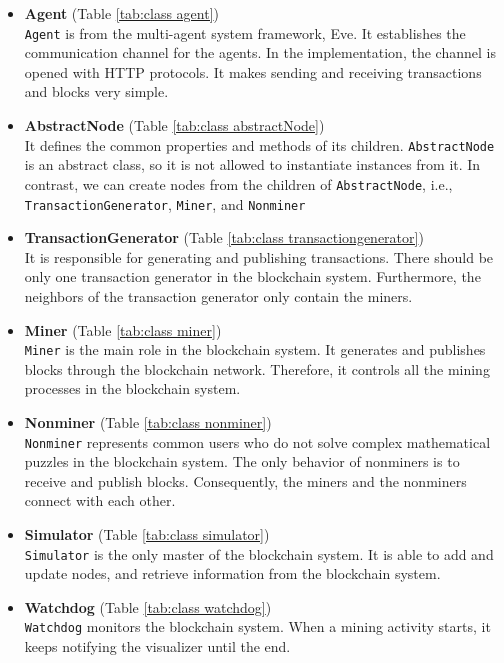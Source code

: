\begin{itemize}
    \item \textbf{Agent} (Table \ref{tab:class agent}) \\
        \texttt{Agent} is from the multi-agent system framework, Eve. It establishes the communication channel for the agents. In the implementation, the channel is opened with HTTP protocols. It makes sending and receiving transactions and blocks very simple. 
    \item \textbf{AbstractNode} (Table \ref{tab:class abstractNode}) \\
        It defines the common properties and methods of its children. \texttt{AbstractNode} is an abstract class, so it is not allowed to instantiate instances from it. In contrast, we can create nodes from the children of \texttt{AbstractNode}, i.e., \texttt{TransactionGenerator}, \texttt{Miner}, and \texttt{Nonminer}
    \item \textbf{TransactionGenerator} (Table \ref{tab:class transactiongenerator}) \\
        It is responsible for generating and publishing transactions. There should be only one transaction generator in the blockchain system. Furthermore, the neighbors of the transaction generator only contain the miners.
    \item \textbf{Miner} (Table \ref{tab:class miner}) \\
        \texttt{Miner} is the main role in the blockchain system. It generates and publishes blocks through the blockchain network. Therefore, it controls all the mining processes in the blockchain system.
    \item \textbf{Nonminer} (Table \ref{tab:class nonminer}) \\
        \texttt{Nonminer} represents common users who do not solve complex mathematical puzzles in the blockchain system. The only behavior of nonminers is to receive and publish blocks. Consequently, the miners and the nonminers connect with each other. 
    \item \textbf{Simulator} (Table \ref{tab:class simulator}) \\
        \texttt{Simulator} is the only master of the blockchain system. It is able to add and update nodes, and retrieve information from the blockchain system.
    \item \textbf{Watchdog} (Table \ref{tab:class watchdog}) \\
        \texttt{Watchdog} monitors the blockchain system. When a mining activity starts, it keeps notifying the visualizer until the end.

\end{itemize}
